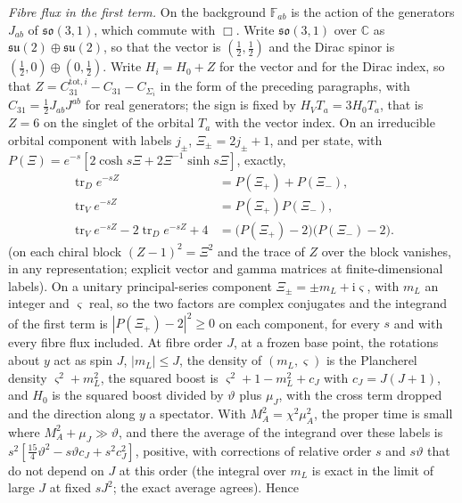 \emph{Fibre flux in the first term.} On the background \(\mathbb F_{ab}\) is the action of the generators \(J_{ab}\) of \(\mathfrak{so}(3,1)\), which commute with \(\Box\). Write \(\mathfrak{so}(3,1)\) over \(\mathbb C\) as \(\mathfrak{su}(2)\oplus\mathfrak{su}(2)\), so that the vector is \((\tfrac12,\tfrac12)\) and the Dirac spinor is \((\tfrac12,0)\oplus(0,\tfrac12)\). Write \(H_i=H_0+Z\) for the vector and for the Dirac index, so that \(Z=C_{31}^{\mathrm{tot},i}-C_{31}-C_{\Sigma_i}\) in the form of the preceding paragraphs, with \(C_{31}=\tfrac12J_{ab}J^{ab}\) for real generators; the sign is fixed by \(H_VT_a=3H_0T_a\), that is \(Z=6\) on the singlet of the orbital \(T_a\) with the vector index. On an irreducible orbital component with labels \(j_\pm\), \(\Xi_\pm=2j_\pm+1\), and per state, with \(P(\Xi)=e^{-s}[2\cosh s\Xi+2\Xi^{-1}\sinh s\Xi]\), exactly,
\[
\begin{aligned}
  \operatorname{tr}_D e^{-sZ}
  &= P(\Xi_+) + P(\Xi_-),\\
  \operatorname{tr}_V e^{-sZ}
  &= P(\Xi_+) P(\Xi_-),\\
  \operatorname{tr}_V e^{-sZ}
  - 2\operatorname{tr}_D e^{-sZ}
  + 4
  &= \bigl(P(\Xi_+)-2\bigr)\bigl(P(\Xi_-)-2\bigr).
\end{aligned}
\]
(on each chiral block \((Z-1)^2=\Xi^2\) and the trace of \(Z\) over the block vanishes, in any representation; explicit vector and gamma matrices at finite-dimensional labels). On a unitary principal-series component \(\Xi_\pm=\pm m_L+\mathrm i\varsigma\), with \(m_L\) an integer and \(\varsigma\) real, so the two factors are complex conjugates and the integrand of the first term is \(|P(\Xi_+)-2|^2\ge0\) on each component, for every \(s\) and with every fibre flux included. At fibre order \(J\), at a frozen base point, the rotations about \(y\) act as spin \(J\), \(|m_L|\le J\), the density of \((m_L,\varsigma)\) is the Plancherel density \(\varsigma^2+m_L^2\), the squared boost is \(\varsigma^2+1-m_L^2+c_J\) with \(c_J=J(J+1)\), and \(H_0\) is the squared boost divided by \(\vartheta\) plus \(\mu_J\), with the cross term dropped and the direction along \(y\) a spectator. With \(M_A^2=\chi^2\mu_A^2\), the proper time is small where \(M_A^2+\mu_J\gg\vartheta\), and there the average of the integrand over these labels is \(s^2[\tfrac{15}4\vartheta^2-s\vartheta c_J+s^2c_J^2]\), positive, with corrections of relative order \(s\) and \(s\vartheta\) that do not depend on \(J\) at this order (the integral over \(m_L\) is exact in the limit of large \(J\) at fixed \(sJ^2\); the exact average agrees). Hence

